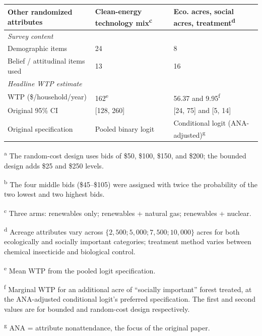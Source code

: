 \begin{table}[h]
{\begin{threeparttable}
\begin{tabular}{lll}
        Other randomized attributes        & Clean-energy technology mix\textsuperscript{c}    & Eco. acres, social acres, treatment\textsuperscript{d} \\
        \midrule
        \multicolumn{3}{l}{\textit{Survey content}} \\
        Demographic items                  & 24                  & 8 \\
        Belief / attitudinal items used    & 13                              & 16 \\
        \midrule
        \multicolumn{3}{l}{\textit{Headline WTP estimate}} \\
        WTP (\$/household/year)            & 162\textsuperscript{e}         & 56.37 and 9.95\textsuperscript{f} \\
        Original 95\% CI                   & [128, 260]                     & [24, 75] and [5, 14]\\
        Original specification             & Pooled binary logit            & Conditional logit (ANA-adjusted)\textsuperscript{g} \\
        \bottomrule
    \end{tabular}
    \begin{tablenotes}\footnotesize
        \item \textsuperscript{a} The random-cost design uses bids of \$50, \$100, \$150, and \$200; the bounded design adds \$25 and \$250 levels.
        \item \textsuperscript{b} The four middle bids (\$45--\$105) were assigned with twice the probability of the two lowest and two highest bids.
        \item \textsuperscript{c} Three arms: renewables only; renewables + natural gas; renewables + nuclear.
        \item \textsuperscript{d} Acreage attributes vary across $\{2{,}500; 5{,}000; 7{,}500; 10{,}000\}$ acres for both ecologically and socially important categories; treatment method varies between chemical insecticide and biological control.
        \item \textsuperscript{e} Mean WTP from the pooled logit specification.
        \item \textsuperscript{f} Marginal WTP for an additional acre of ``socially important'' forest treated, at the ANA-adjusted conditional logit's preferred specification. The first and second values are for bounded and random-cost design respectively.
        \item \textsuperscript{g} ANA = attribute nonattendance, the focus of the original paper.
    \end{tablenotes}
    \end{threeparttable}
    }
\end{table}